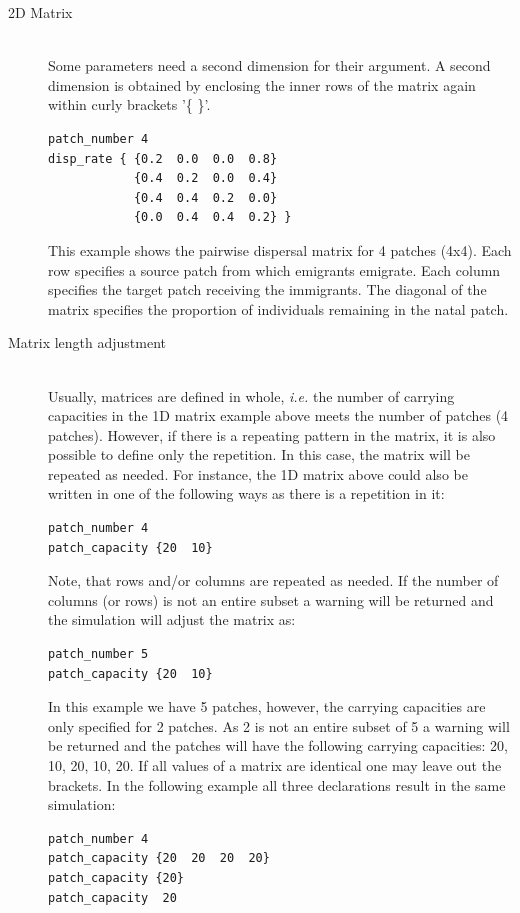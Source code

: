 \documentclass[letterpaper,12pt,oneside]{book}
\begin{document}
\begin{description}
\begin{description}
\item[2D Matrix]\hspace*{\fill}\\
Some parameters need a second dimension for their argument. A second dimension is obtained by enclosing the inner rows of the matrix again within curly brackets '\{ \}'.
\begin{lstlisting}[frame=single]
patch_number 4
disp_rate { {0.2  0.0  0.0  0.8}
            {0.4  0.2  0.0  0.4}
            {0.4  0.4  0.2  0.0}
            {0.0  0.4  0.4  0.2} }
\end{lstlisting}
This example shows the pairwise dispersal matrix for 4 patches (4x4). Each row specifies a source patch from which emigrants emigrate. Each column specifies the target patch receiving the immigrants. The diagonal of the matrix specifies the proportion of individuals remaining in the natal patch.

\item[Matrix length adjustment]\hspace*{\fill}\\
Usually, matrices are defined in whole, \textit{i.e.} the number of carrying capacities in the 1D matrix example above meets the number of patches (4 patches). However, if there is a repeating pattern in the matrix, it is also possible to define only the repetition. In this case, the matrix will be repeated as needed. For instance, the 1D matrix above could also be written in one of the following ways as there is a repetition in it: 
\begin{lstlisting}[frame=single]
patch_number 4
patch_capacity {20  10}
\end{lstlisting}
Note, that rows and/or columns are repeated as needed. If the number of columns (or rows) is not an entire subset a warning will be returned and the simulation will adjust the matrix as:
\begin{lstlisting}[frame=single]
patch_number 5
patch_capacity {20  10}
\end{lstlisting}
In this example we have 5 patches, however, the carrying capacities are only specified for 2 patches. As 2 is not an entire subset of 5 a warning will be returned and the patches will have the following carrying capacities: 20, 10, 20, 10, 20. If all values of a matrix are identical one may leave out the brackets. In the following example all three declarations result in the same simulation:
\begin{lstlisting}[frame=single]
patch_number 4
patch_capacity {20  20  20  20}
patch_capacity {20}
patch_capacity  20
\end{lstlisting}



\end{description}
\end{description}
\end{document}
